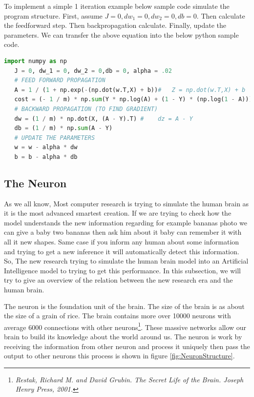 To implement a simple 1 iteration example below sample code simulate the program structure. First,  assume $J = 0, dw_1 = 0, dw_2 = 0,db = 0$. Then calculate the feedforward step. Then backpropagation calculate. Finally, update the parameters. We can transfer the above equation into the below python sample code. 
 \begin{lstlisting}[language=Python]
   import numpy as np
   J = 0, dw_1 = 0, dw_2 = 0,db = 0, alpha = .02
   # FEED FORWARD PROPAGATION
   A = 1 / (1 + np.exp(-(np.dot(w.T,X) + b))#   Z = np.dot(w.T,X) + b
   cost = (- 1 / m) * np.sum(Y * np.log(A) + (1 - Y) * (np.log(1 - A)))
   # BACKWARD PROPAGATION (TO FIND GRADIENT)
   dw = (1 / m) * np.dot(X, (A - Y).T) #    dz = A - Y
   db = (1 / m) * np.sum(A - Y)
   # UPDATE THE PARAMETERS
   w = w - alpha * dw
   b = b - alpha * db
 \end{lstlisting}

 
 \subsection{The Neuron}

 As we all know, Most computer research is trying to simulate the human brain as it is the most advanced smartest creation. If we are trying to check how the model understands the new information regarding for example bananas photo we can give a baby two bananas then ask him about it baby can remember it with all it new shapes. Same case if you inform any human about some information and trying to get a new inference it will automatically detect this information. So, The new research trying to simulate the human brain model into an Artificial Intelligence model to trying to get this performance. In this subsection, we will try to give an overview of the relation between the new research era and the human brain.
 
 The neuron is the foundation unit of the brain. The size of the brain is as about the size of a grain of rice. The brain contains more over 10000 neurons with average 6000 connections with other neurons\footnote{\textit{Restak, Richard M. and David Grubin. The Secret Life of the Brain. Joseph Henry Press, 2001.}}.  These massive networks allow our brain to build its knowledge about the world around us. The neuron is work by receiving the information from other neuron and process it uniquely then pass the output to other neurons this process is shown in figure \ref{fig:NeuronStructure}.


